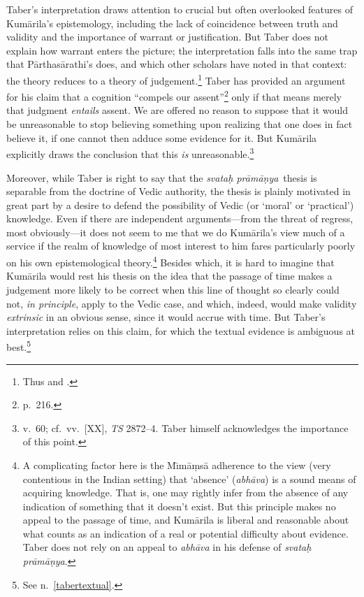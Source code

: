 \documentclass[11pt,letterpaper,oneside]{amsart}
\newcommand{\e}{\emph}
\newcommand{\svapra}{\e{svata\d{h} pr\={a}m\={a}\d{n}ya}}
\begin{document}
Taber's interpretation draws attention to crucial but often overlooked features of Kum\=arila's epistemology, including the lack of coincidence between truth and validity and the importance of warrant or justification. But Taber does not explain how warrant enters the picture; the interpretation falls into the same trap that P\=arthas\=arathi's does, and which other scholars have noted in that context: the theory reduces to a theory of judgement.\footnote{Thus \citet[p.\ 8]{mohanty1989gangesa} and \citet[p.\ 52]{chatterjea2003svatah}.} Taber has provided an argument for his claim that a cognition ``compels our assent''\footnote{p.\ 216.} only if that means merely that judgment \emph{entails} assent. We are offered no reason to suppose that it would be unreasonable to stop believing something upon realizing that one does in fact believe it, if one cannot then adduce some evidence for it. But Kum\=arila explicitly draws the conclusion that this \e{is} unreasonable.\footnote{v.\ 60; cf.\ vv.\ [XX], \emph{TS} 2872--4. Taber himself acknowledges the importance of this point.\label{reasonableness}}



Moreover, while Taber is right to say that the \svapra\ thesis is separable from the doctrine of Vedic authority, the thesis is plainly motivated in great part by a desire to defend the possibility of Vedic (or `moral' or `practical') knowledge. Even if there are independent arguments---from the threat of regress, most obviously---it does not seem to me that we do Kum\=arila's view much of a service if the realm of knowledge of most interest to him fares particularly poorly on his own epistemological theory.\footnote{A complicating factor here is the M\={\i}m\=a\d ms\=a adherence to the view (very contentious in the Indian setting) that `absence' (\emph{abh\=ava}) is a sound means of acquiring knowledge. That is, one may rightly infer from the absence of any indication of something that it doesn't exist. But this principle makes no appeal to the passage of time, and Kum\=arila is liberal and reasonable about what counts as an indication of a real or potential difficulty about evidence. Taber does not rely on an appeal to \emph{abh\=ava} in his defense of \emph{svata\d h pr\=am\=a\d nya}.} Besides which, it is hard to imagine that Kum\=arila would rest his thesis on the idea that the passage of time makes a judgement more likely to be correct when this line of thought so clearly could not, \emph{in principle}, apply to the Vedic case, and which, indeed, would make validity \emph{extrinsic} in an obvious sense, since it would accrue with time. But Taber's interpretation relies on this claim, for which the textual evidence is ambiguous at best.\footnote{See n.\ \ref{tabertextual}.}
\end{document}
